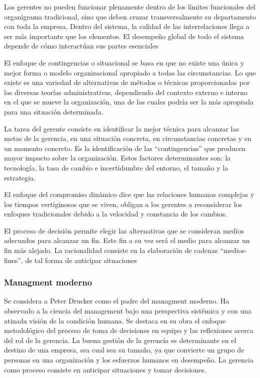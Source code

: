 \documentclass[titlepage,a4paper]{article}
\begin{document}
Los gerentes no pueden funcionar plenamente dentro de los límites funcionales del organigrama tradicional, sino que deben cruzar transversalmente su departamento con toda la empresa. Dentro del sistema, la calidad de las interrelaciones llega a ser más importante que los elementos. El desempeño global de todo el sistema depende de cómo interactúan sus partes esenciales

El enfoque de contingencias o situacional se basa en que no existe una única y mejor forma o modelo organizacional apropiado a todas las circunstancias. Lo que existe es una variedad de alternativas de métodos o técnicas proporcionadas por las diversas teorías administrativas, dependiendo del contexto externo e interno en el que se mueve la organización, una de las cuales podría ser la más apropiada para una situación determinada.

La tarea del gerente consiste en identificar la mejor técnica para alcanzar las metas de la gerencia, en una situación concreta, en circunstancias concretas y en un momento concreto. Es la identificación de las “contingencias” que producen mayor impacto sobre la organización. Estos factores determinantes son: la tecnología, la tasa de cambio e incertidumbre del entorno, el tamaño y la estrategia. 

El enfoque del compromiso dinámico dice que las relaciones humanas complejas y los tiempos vertiginosos que se viven, obligan a los gerentes a reconsiderar los enfoques tradicionales debido a la velocidad y constancia de los cambios. 

El proceso de decisión permite elegir las alternativas que se consideran medios adecuados para alcanzar un fin. Este fin a su vez será el medio para alcanzar un fin más alejado. La racionalidad consiste en la elaboración de cadenas “medios-fines”, de tal forma de anticipar situaciones

\subsubsection*{Managment moderno}
Se considera a Peter Drucker como el padre del managment moderno. Ha observado a la ciencia del management bajo una perspectiva sistémica y con una atinada visión de la condición humana. Se destaca en su obra el enfoque metodológico del proceso de toma de decisiones en equipo y las reflexiones acerca del rol de la gerencia. La buena gestión de la gerencia es determinante en el destino de una empresa, sea cual sea su tamaño, ya que convierte un grupo de personas en una organización y los esfuerzos humanos en desempeño. La gerencia como proceso consiste en anticipar situaciones y tomar decisiones. 
\end{document}
